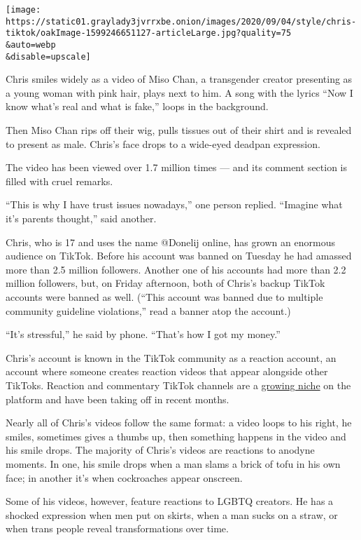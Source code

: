 \texttt{[image: https://static01.graylady3jvrrxbe.onion/images/2020/09/04/style/chris-tiktok/oakImage-1599246651127-articleLarge.jpg?quality=75\\\&auto=webp\\\&disable=upscale]}

Chris smiles widely as a video of Miso Chan, a transgender creator
presenting as a young woman with pink hair, plays next to him. A song
with the lyrics ``Now I know what's real and what is fake,'' loops in
the background.

Then Miso Chan rips off their wig, pulls tissues out of their shirt and
is revealed to present as male. Chris's face drops to a wide-eyed
deadpan expression.

The video has been viewed over 1.7 million times --- and its comment
section is filled with cruel remarks.

``This is why I have trust issues nowadays,'' one person replied.
``Imagine what it's parents thought,'' said another.

Chris, who is 17 and uses the name @Donelij online, has grown an
enormous audience on TikTok. Before his account was banned on Tuesday he
had amassed more than 2.5 million followers. Another one of his accounts
had more than 2.2 million followers, but, on Friday afternoon, both of
Chris's backup TikTok accounts were banned as well. (``This account was
banned due to multiple community guideline violations,'' read a banner
atop the account.)

``It's stressful,'' he said by phone. ``That's how I got my money.''

Chris's account is known in the TikTok community as a reaction account,
an account where someone creates reaction videos that appear alongside
other TikToks. Reaction and commentary TikTok channels are a
\href{https://www.nytimes3xbfgragh.onion/2020/07/02/style/tati-devin-tiktok.html}{growing
niche} on the platform and have been taking off in recent months.

Nearly all of Chris's videos follow the same format: a video loops to
his right, he smiles, sometimes gives a thumbs up, then something
happens in the video and his smile drops. The majority of Chris's videos
are reactions to anodyne moments. In one, his smile drops when a man
slams a brick of tofu in his own face; in another it's when cockroaches
appear onscreen.

Some of his videos, however, feature reactions to LGBTQ creators. He has
a shocked expression when men put on skirts, when a man sucks on a
straw, or when trans people reveal transformations over time.

